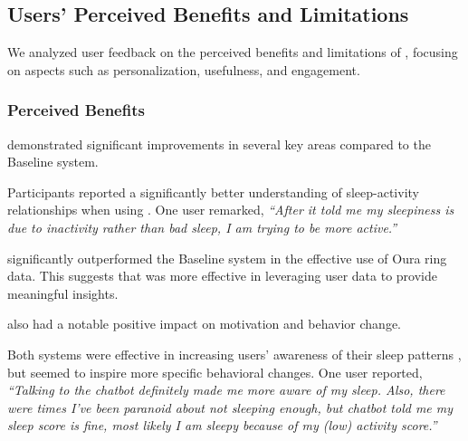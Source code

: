 \subsection{Users' Perceived Benefits and Limitations}
We analyzed user feedback on the perceived benefits and limitations of \name{}, focusing on aspects such as personalization, usefulness, and engagement.

\subsubsection{Perceived Benefits}
\name{} demonstrated significant improvements in several key areas compared to the Baseline system. 

Participants reported a significantly better understanding of sleep-activity relationships when using \name{}. 
 One user remarked, \textit{``After it told me my sleepiness is due to inactivity rather than bad sleep, I am trying to be more active.''}

\name{} significantly outperformed the Baseline system in the effective use of Oura ring data.
 This suggests that \name{} was more effective in leveraging user data to provide meaningful insights.

\name{} also had a notable positive impact on motivation and behavior change. 


Both systems were effective in increasing users' awareness of their sleep patterns , but \name{} seemed to inspire more specific behavioral changes. One user reported, 
\textit{``Talking to the chatbot definitely made me more aware of my sleep. Also, there were times I've been paranoid about not sleeping enough, but chatbot told me my sleep score is fine, most likely I am sleepy because of my (low) activity score.''}


